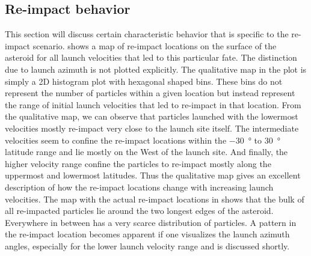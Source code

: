 \subsection{Re-impact behavior}
This section will discuss certain characteristic behavior that is specific to the re-impact scenario.  shows a map of re-impact locations on the surface of the asteroid for all launch velocities that led to this particular fate. The distinction due to launch azimuth is not plotted explicitly. The qualitative map in the plot is simply a 2D histogram plot with hexagonal shaped bins. These bins do not represent the number of particles within a given location but instead represent the range of initial launch velocities that led to re-impact in that location. From the qualitative map, we can observe that particles launched with the lowermost velocities mostly re-impact very close to the launch site itself. The intermediate velocities seem to confine the re-impact locations within the \SI{-30}{\degree} to \SI{+30}{\degree} latitude range and lie mostly on the West of the launch site. And finally, the higher velocity range confine the particles to re-impact mostly along the uppermost and lowermost latitudes.
%
\newline\newline
%
Thus the qualitative map gives an excellent description of how the re-impact locations change with increasing launch velocities. The map with the actual re-impact locations in  shows that the bulk of all re-impacted particles lie around the two longest edges of the asteroid. Everywhere in between has a very scarce distribution of particles. A pattern in the re-impact location becomes apparent if one visualizes the launch azimuth angles, especially for the lower launch velocity range and is discussed shortly.
